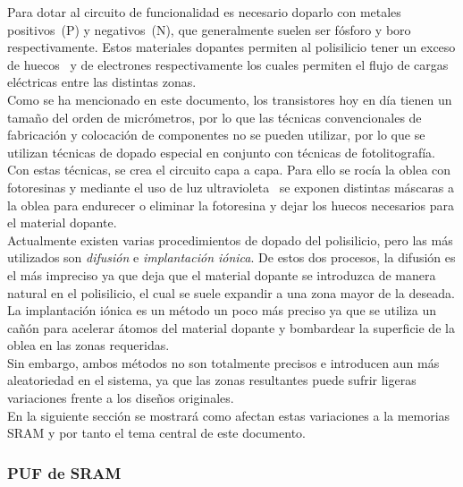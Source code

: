 \documentclass[spanish]{template/minim}
\begin{document}
Para dotar al circuito de funcionalidad es necesario doparlo con metales positivos~({\color{accent}P}) y negativos~({\color{accent}N}), que generalmente suelen ser fósforo y boro respectivamente. Estos materiales dopantes permiten al polisilicio tener un exceso de {\color{accent}huecos}~ y de {\color{accent}electrones} respectivamente los cuales permiten el flujo de cargas eléctricas entre las distintas zonas.\\

Como se ha mencionado en este documento, los transistores hoy en día tienen un tamaño del orden de micrómetros, por lo que las técnicas convencionales de fabricación y colocación de componentes no se pueden utilizar, por lo que se utilizan técnicas de dopado especial en conjunto con técnicas de fotolitografía.\\

Con estas técnicas, se crea el circuito capa a capa. Para ello se rocía la oblea con fotoresinas y mediante el uso de luz ultravioleta~ se exponen distintas máscaras a la oblea para endurecer o eliminar la fotoresina y dejar los huecos necesarios para el material dopante.\\

Actualmente existen varias procedimientos de dopado del polisilicio, pero las más utilizados son \textit{difusión} e \textit{implantación iónica}. De estos dos procesos, la difusión es el más impreciso ya que deja que el material dopante se introduzca de manera natural en el polisilicio, el cual se suele expandir a una zona mayor de la deseada. La implantación iónica es un método un poco más preciso ya que se utiliza un cañón para acelerar átomos del material dopante y bombardear la superficie de la oblea en las zonas requeridas.\\

Sin embargo, ambos métodos no son totalmente precisos e introducen aun más aleatoriedad en el sistema, ya que las zonas resultantes puede sufrir ligeras variaciones frente a los diseños originales.\\

En la siguiente sección se mostrará como afectan estas variaciones a la memorias SRAM y por tanto el tema central de este documento.


\subsubsection{PUF de SRAM}\label{sec:puf_sram}
\end{document}
